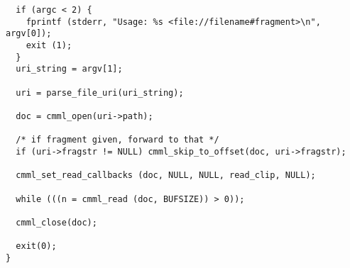 \begin{verbatim}
  if (argc < 2) {
    fprintf (stderr, "Usage: %s <file://filename#fragment>\n", argv[0]);
    exit (1);
  }
  uri_string = argv[1];
 
  uri = parse_file_uri(uri_string);

  doc = cmml_open(uri->path);

  /* if fragment given, forward to that */
  if (uri->fragstr != NULL) cmml_skip_to_offset(doc, uri->fragstr);

  cmml_set_read_callbacks (doc, NULL, NULL, read_clip, NULL);

  while (((n = cmml_read (doc, BUFSIZE)) > 0));
  
  cmml_close(doc);

  exit(0);
}
\end{verbatim}
\normalsize
 